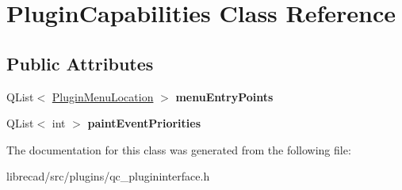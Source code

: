 \hypertarget{classPluginCapabilities}{\section{Plugin\-Capabilities Class Reference}
\label{classPluginCapabilities}
}
\subsection*{Public Attributes}
\begin{DoxyCompactItemize}
\item 
\hypertarget{classPluginCapabilities_a021b85c879a4cf4f09c94bec18d9f1b9}{Q\-List$<$ \hyperlink{classPluginMenuLocation}{Plugin\-Menu\-Location} $>$ {\bfseries menu\-Entry\-Points}}\label{classPluginCapabilities_a021b85c879a4cf4f09c94bec18d9f1b9}

\item 
\hypertarget{classPluginCapabilities_ab67295d958c123dde1f08900ededa5e9}{Q\-List$<$ int $>$ {\bfseries paint\-Event\-Priorities}}\label{classPluginCapabilities_ab67295d958c123dde1f08900ededa5e9}

\end{DoxyCompactItemize}


The documentation for this class was generated from the following file\-:\begin{DoxyCompactItemize}
\item 
librecad/src/plugins/qc\-\_\-plugininterface.\-h\end{DoxyCompactItemize}
